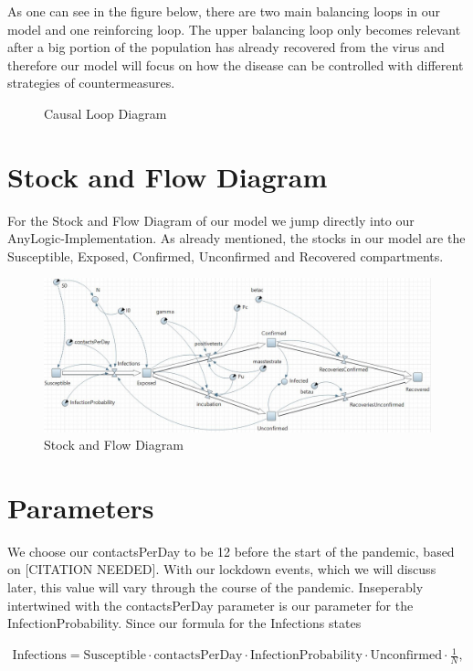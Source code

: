 \documentclass
[
    a4paper,
    11pt,
    bibliography = totoc,
    listof = totoc,
    headinclude = true,
]
{scrbook}
\begin{document}
As one can see in the figure below, there are two main balancing loops
in our model and one reinforcing loop. The upper balancing loop only
becomes relevant after a big portion of the population has already recovered
from the virus and therefore our model will focus on how the disease can
be controlled with different strategies of countermeasures.

\begin{figure}[hbt!]
  \caption{Causal Loop Diagram}
  
\end{figure}

\section{Stock and Flow Diagram}

For the Stock and Flow Diagram of our model we jump directly into
our AnyLogic-Implementation. As already mentioned, the stocks in our model
are the Susceptible, Exposed, Confirmed, Unconfirmed and Recovered compartments.

\begin{figure}[hbt!]
  \caption{Stock and Flow Diagram}
  \includegraphics[width=\linewidth]{../AnyLogicSIR.JPG}
\end{figure}

\FloatBarrier

\section{Parameters}

We choose our contactsPerDay to be 12 before the start of the pandemic,
based on [CITATION NEEDED]. With our lockdown events, which we will discuss
later, this value will vary through the course of the pandemic.
Inseperably intertwined with the contactsPerDay parameter is our parameter
for the InfectionProbability. Since our formula for the Infections states

\begin{align*}
  \text{Infections} = \text{Susceptible} \cdot \text{contactsPerDay} \cdot
  \text{InfectionProbability} \cdot
  \text{Unconfirmed} \cdot \frac{1}{N},
\end{align*}
\end{document}
